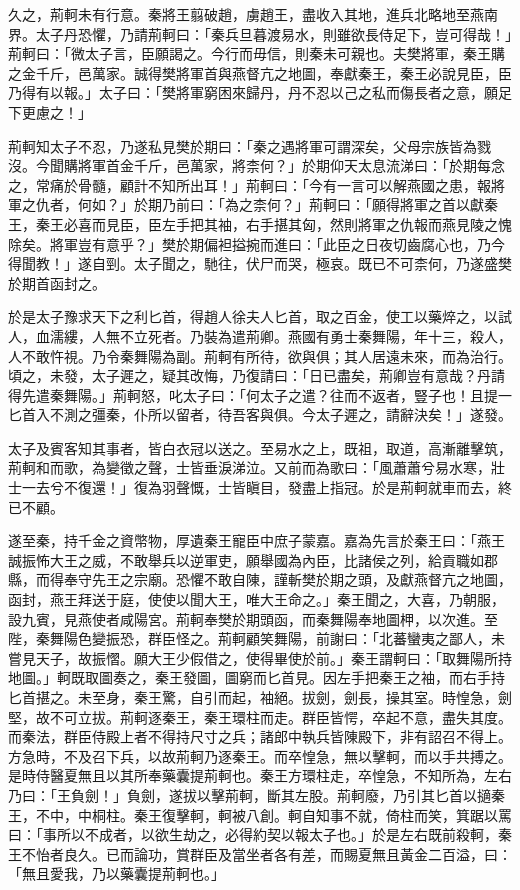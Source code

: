 \begin{pinyinscope}
久之，荊軻未有行意。秦將王翦破趙，虜趙王，盡收入其地，進兵北略地至燕南界。太子丹恐懼，乃請荊軻曰：「秦兵旦暮渡易水，則雖欲長侍足下，豈可得哉！」荊軻曰：「微太子言，臣願謁之。今行而毋信，則秦未可親也。夫樊將軍，秦王購之金千斤，邑萬家。誠得樊將軍首與燕督亢之地圖，奉獻秦王，秦王必說見臣，臣乃得有以報。」太子曰：「樊將軍窮困來歸丹，丹不忍以己之私而傷長者之意，願足下更慮之！」

荊軻知太子不忍，乃遂私見樊於期曰：「秦之遇將軍可謂深矣，父母宗族皆為戮沒。今聞購將軍首金千斤，邑萬家，將柰何？」於期仰天太息流涕曰：「於期每念之，常痛於骨髓，顧計不知所出耳！」荊軻曰：「今有一言可以解燕國之患，報將軍之仇者，何如？」於期乃前曰：「為之柰何？」荊軻曰：「願得將軍之首以獻秦王，秦王必喜而見臣，臣左手把其袖，右手揕其匈，然則將軍之仇報而燕見陵之愧除矣。將軍豈有意乎？」樊於期偏袒搤捥而進曰：「此臣之日夜切齒腐心也，乃今得聞教！」遂自剄。太子聞之，馳往，伏尸而哭，極哀。既已不可柰何，乃遂盛樊於期首函封之。

於是太子豫求天下之利匕首，得趙人徐夫人匕首，取之百金，使工以藥焠之，以試人，血濡縷，人無不立死者。乃裝為遣荊卿。燕國有勇士秦舞陽，年十三，殺人，人不敢忤視。乃令秦舞陽為副。荊軻有所待，欲與俱；其人居遠未來，而為治行。頃之，未發，太子遲之，疑其改悔，乃復請曰：「日已盡矣，荊卿豈有意哉？丹請得先遣秦舞陽。」荊軻怒，叱太子曰：「何太子之遣？往而不返者，豎子也！且提一匕首入不測之彊秦，仆所以留者，待吾客與俱。今太子遲之，請辭決矣！」遂發。

太子及賓客知其事者，皆白衣冠以送之。至易水之上，既祖，取道，高漸離擊筑，荊軻和而歌，為變徵之聲，士皆垂淚涕泣。又前而為歌曰：「風蕭蕭兮易水寒，壯士一去兮不復還！」復為羽聲慨，士皆瞋目，發盡上指冠。於是荊軻就車而去，終已不顧。

遂至秦，持千金之資幣物，厚遺秦王寵臣中庶子蒙嘉。嘉為先言於秦王曰：「燕王誠振怖大王之威，不敢舉兵以逆軍吏，願舉國為內臣，比諸侯之列，給貢職如郡縣，而得奉守先王之宗廟。恐懼不敢自陳，謹斬樊於期之頭，及獻燕督亢之地圖，函封，燕王拜送于庭，使使以聞大王，唯大王命之。」秦王聞之，大喜，乃朝服，設九賓，見燕使者咸陽宮。荊軻奉樊於期頭函，而秦舞陽奉地圖柙，以次進。至陛，秦舞陽色變振恐，群臣怪之。荊軻顧笑舞陽，前謝曰：「北蕃蠻夷之鄙人，未嘗見天子，故振慴。願大王少假借之，使得畢使於前。」秦王謂軻曰：「取舞陽所持地圖。」軻既取圖奏之，秦王發圖，圖窮而匕首見。因左手把秦王之袖，而右手持匕首揕之。未至身，秦王驚，自引而起，袖絕。拔劍，劍長，操其室。時惶急，劍堅，故不可立拔。荊軻逐秦王，秦王環柱而走。群臣皆愕，卒起不意，盡失其度。而秦法，群臣侍殿上者不得持尺寸之兵；諸郎中執兵皆陳殿下，非有詔召不得上。方急時，不及召下兵，以故荊軻乃逐秦王。而卒惶急，無以擊軻，而以手共搏之。是時侍醫夏無且以其所奉藥囊提荊軻也。秦王方環柱走，卒惶急，不知所為，左右乃曰：「王負劍！」負劍，遂拔以擊荊軻，斷其左股。荊軻廢，乃引其匕首以擿秦王，不中，中桐柱。秦王復擊軻，軻被八創。軻自知事不就，倚柱而笑，箕踞以罵曰：「事所以不成者，以欲生劫之，必得約契以報太子也。」於是左右既前殺軻，秦王不怡者良久。已而論功，賞群臣及當坐者各有差，而賜夏無且黃金二百溢，曰：「無且愛我，乃以藥囊提荊軻也。」


\end{pinyinscope}
